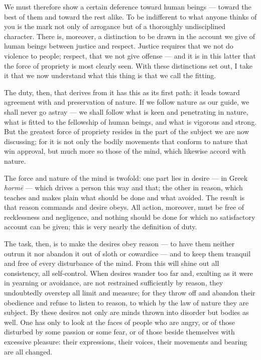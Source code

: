  We must therefore show a certain deference toward human beings — toward the best of them and toward the rest alike. To be indifferent to what anyone thinks of you is the mark not only of arrogance but of a thoroughly undisciplined character. There is, moreover, a distinction to be drawn in the account we give of human beings between justice and respect. Justice requires that we not do violence to people; respect, that we not give offense — and it is in this latter that the force of propriety is most clearly seen. With these distinctions set out, I take it that we now understand what this thing is that we call the fitting.

 The duty, then, that derives from it has this as its first path: it leads toward agreement with and preservation of nature. If we follow nature as our guide, we shall never go astray — we shall follow what is keen and penetrating in nature, what is fitted to the fellowship of human beings, and what is vigorous and strong. But the greatest force of propriety resides in the part of the subject we are now discussing; for it is not only the bodily movements that conform to nature that win approval, but much more so those of the mind, which likewise accord with nature.

 The force and nature of the mind is twofold: one part lies in desire — in Greek \textit{horm\={e}} — which drives a person this way and that; the other in reason, which teaches and makes plain what should be done and what avoided. The result is that reason commands and desire obeys. All action, moreover, must be free of recklessness and negligence, and nothing should be done for which no satisfactory account can be given; this is very nearly the definition of duty.

 The task, then, is to make the desires obey reason — to have them neither outrun it nor abandon it out of sloth or cowardice — and to keep them tranquil and free of every disturbance of the mind. From this will shine out all consistency, all self-control. When desires wander too far and, exulting as it were in yearning or avoidance, are not restrained sufficiently by reason, they undoubtedly overstep all limit and measure; for they throw off and abandon their obedience and refuse to listen to reason, to which by the law of nature they are subject. By these desires not only are minds thrown into disorder but bodies as well. One has only to look at the faces of people who are angry, or of those disturbed by some passion or some fear, or of those beside themselves with excessive pleasure: their expressions, their voices, their movements and bearing are all changed.

